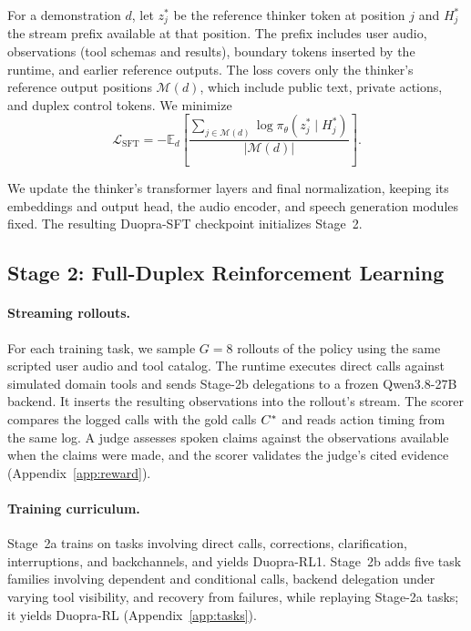 For a demonstration $d$, let $z_j^*$ be the reference thinker token at position $j$ and $H_j^*$ the stream prefix available at that position. The prefix includes user audio, observations (tool schemas and results), boundary tokens inserted by the runtime, and earlier reference outputs. The loss covers only the thinker's reference output positions $\mathcal{M}(d)$, which include public text, private actions, and duplex control tokens. We minimize
\begin{equation}
\label{eq:sft}
\mathcal L_{\mathrm{SFT}}=-\mathbb{E}_{d}
\!\left[\frac{\sum_{j\in\mathcal{M}(d)}\log\pi_\theta(z_j^*\mid H_j^*)}
{|\mathcal{M}(d)|}\right].
\end{equation}

We update the thinker's transformer layers and final normalization, keeping its embeddings and output head, the audio encoder, and speech generation modules fixed. The resulting Duopra-SFT checkpoint initializes Stage~2.


\subsection{Stage 2: Full-Duplex Reinforcement Learning}
\label{sec:rl}

\paragraph{Streaming rollouts.}
For each training task, we sample $G=8$ rollouts of the policy using the same scripted user audio and tool catalog. The runtime executes direct calls against simulated domain tools and sends Stage-2b delegations to a frozen Qwen3.8-27B backend. It inserts the resulting observations into the rollout's stream. The scorer compares the logged calls with the gold calls $C^{\ast}$ and reads action timing from the same log. A judge assesses spoken claims against the observations available when the claims were made, and the scorer validates the judge's cited evidence (Appendix~\ref{app:reward}).

\paragraph{Training curriculum.}
\label{sec:stage2a}\label{sec:stage2b}
Stage~2a trains on tasks involving direct calls, corrections, clarification, interruptions, and backchannels, and yields Duopra-RL1. Stage~2b adds five task families involving dependent and conditional calls, backend delegation under varying tool visibility, and recovery from failures, while replaying Stage-2a tasks; it yields Duopra-RL (Appendix~\ref{app:tasks}).


